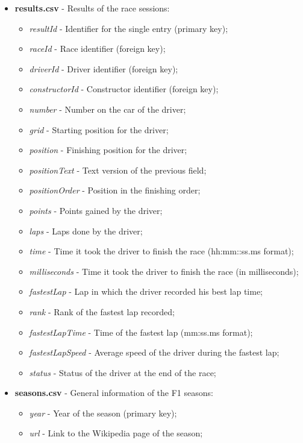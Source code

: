 \documentclass{Configuration_Files/PoliMi3i_thesis}
\begin{document}
\begin{itemize}
    \item \textbf{results.csv} - Results of the race sessions:
    \begin{itemize}
        \item \textit{resultId} - Identifier for the single entry (primary key);
        \item \textit{raceId} - Race identifier (foreign key);
        \item \textit{driverId} - Driver identifier (foreign key);
        \item \textit{constructorId} - Constructor identifier (foreign key);
        \item \textit{number} - Number on the car of the driver;
        \item \textit{grid} - Starting position for the driver;
        \item \textit{position} - Finishing position for the driver;
        \item \textit{positionText} - Text version of the previous field;
        \item \textit{positionOrder} - Position in the finishing order;
        \item \textit{points} - Points gained by the driver;
        \item \textit{laps} - Laps done by the driver;
        \item \textit{time} - Time it took the driver to finish the race (hh:mm::ss.ms format);
        \item \textit{milliseconds} - Time it took the driver to finish the race (in milliseconds);
        \item \textit{fastestLap} - Lap in which the driver recorded his best lap time;
        \item \textit{rank} - Rank of the fastest lap recorded;
        \item \textit{fastestLapTime} - Time of the fastest lap (mm:ss.ms format);
        \item \textit{fastestLapSpeed} - Average speed of the driver during the fastest lap;
        \item \textit{status} - Status of the driver at the end of the race;
    \end{itemize}

    \item \textbf{seasons.csv} - General information of the F1 seasons:
    \begin{itemize}
        \item \textit{year} - Year of the season (primary key);
        \item \textit{url} - Link to the Wikipedia page of the season;
    \end{itemize}


\end{itemize}
\end{document}
